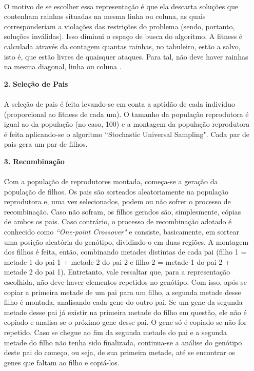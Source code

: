 \documentclass{report}
\begin{document}
\begin{itemize}
		\paragraph{} O motivo de se escolher essa representação é que ela descarta soluções que contenham rainhas situadas na mesma linha ou coluna, as quais corresponderiam a violações das restrições do problema (sendo, portanto, soluções inválidas). Isso diminui o espaço de busca do algoritmo. A fitness é calculada através da contagem quantas rainhas, no tabuleiro, estão a salvo, isto é, que estão livres de quaisquer ataques. Para tal, não deve haver rainhas na mesma diagonal, linha ou coluna .\\
		
		\item[\textbf{2.}] \textbf{Seleção de Pais}
				
		\paragraph{} A seleção de pais é feita levando-se em conta a aptidão de cada indivíduo (proporcional ao fitness de cada um). O tamanho da população reprodutora é igual ao da população (no caso, 100) e a montagem da população reprodutora é feita aplicando-se o algoritmo ``Stochastic Universal Sampling". Cada par de pais gera um par de filhos.\\
		
		\item[\textbf{3.}] \textbf{Recombinação}
		
		\paragraph{} Com a população de reprodutores montada, começa-se a geração da população de filhos. Os pais são sorteados aleatoriamente na população reprodutora e, uma vez selecionados, podem ou não sofrer o processo de recombinação. Caso não sofram, os filhos gerados são, simplesmente, cópias de ambos os pais. Caso contrário, o processo de recombinação adotado é conhecido como \emph{``One-point Crossover"} e consiste, basicamente, em sortear uma posição aleatória do genótipo, dividindo-o em duas regiões. A montagem dos filhos é feita, então, combinando metades distintas de cada pai (filho 1 = metade 1 do pai 1 + metade 2 do pai 2 e filho 2 = metade 1 do pai 2 + metade 2 do pai 1). Entretanto, vale ressaltar que, para a representação escolhida, não deve haver elementos repetidos no genótipo. Com isso, após se copiar a primeira metade de um pai para um filho, a segunda metade desse filho é montada, analisando cada gene do outro pai. Se um gene da segunda metade desse pai já existir na primeira metade do filho em questão, ele não é copiado e analisa-se o próximo gene desse pai. O gene só é copiado se não for repetido. Caso se chegue ao fim da segunda metade do pai e a segunda metade do filho não tenha sido finalizada, continua-se a análise do genótipo deste pai do começo, ou seja, de sua primeira metade, até se encontrar os genes que faltam ao filho e copiá-los.\\
		

\end{itemize}
\end{document}
